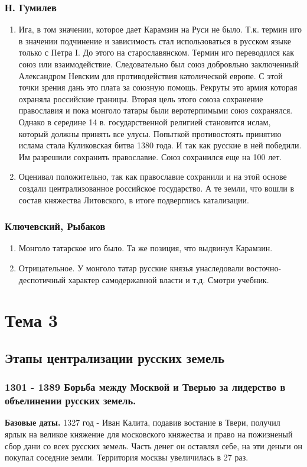 \documentclass[a4paper]{article}
\begin{document}
\subsubsection{Н. Гумилев}
\begin{enumerate}
    \item Ига, в том значении, которое дает Карамзин на Руси не было. Т.к. термин иго в значении подчинение и зависимость стал использоваться в русском языке только с Петра I. До этого на старославянском. Термин иго переводился как союз или взаимодействие. Следовательно был союз добровльно заключенный Александром Невским для противодействия католической европе.
    С этой точки зрения дань это плата за союзную помощь. Рекруты это армия которая охраняла российские границы. Вторая цель этого союза сохранение православия и пока монголо татары были веротерпимыми союз сохранялся. Однако в середине 14 в. государственной религией становится ислам, который должны принять все улусы. Попыткой противостоять принятию ислама стала Куликовская битва 1380 года. И так как русские в ней победили. Им разрешили сохранить православие. Союз сохранился еще на 100 лет.
    \item Оценивал положительно, так как православие сохранили и на этой основе создали централизованное российское государство. А те земли, что вошли в состав княжества Литовского, в итоге подверглись катализации.
\end{enumerate}

\subsubsection{Ключевский, Рыбаков}
\begin{enumerate}
    \item Монголо татарское иго было. Та же позиция, что выдвинул Карамзин.
    \item Отрицательное. У монголо татар русские князья унаследовали восточно-деспотичный характер самодержавной власти и т.д. Смотри учебник.
\end{enumerate}

\section{Тема 3}
\subsection{Этапы централизации русских земель}
\subsubsection{1301 - 1389 Борьба между Москвой и Тверью за лидерство в объелинении русских земель.}
\textbf{Базовые даты.}
1327 год - Иван Калита, подавив востание в Твери, получил ярлык на великое княжение для московского княжества и право на пожизненый сбор дани со всех русских земель. Часть денег он оставлял себе, на эти деньги он покупал соседние земли.
Территория москвы увеличилась в 27 раз.
\end{document}

